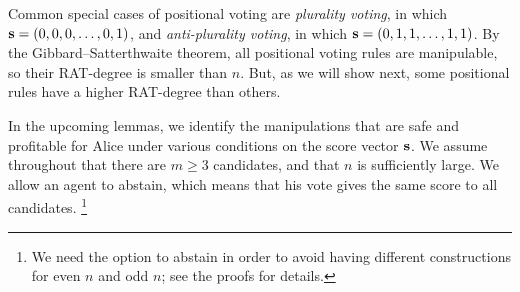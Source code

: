 Common special cases of positional voting are \emph{plurality voting}, in which $\mathbf{s} = (0,0,0,\ldots,0,1)$, and 
\emph{anti-plurality voting}, in which $\mathbf{s} = (0,1,1,\ldots,1,1)$.
By the Gibbard--Satterthwaite theorem, all positional voting rules are manipulable, so their RAT-degree is smaller than $n$.
But, as we will show next, some positional rules have a higher RAT-degree than others.


In the upcoming lemmas, we identify the manipulations that are safe and profitable for Alice under various conditions on the score vector $\mathbf{s}$. We assume throughout that there are $m\geq 3$ candidates, and that $n$ is sufficiently large.
We allow an agent to abstain, which means that his vote gives the same score to all candidates.%
\footnote{
We need the option to abstain in order to avoid having different constructions for even $n$ and odd $n$; see the proofs for details.
}


